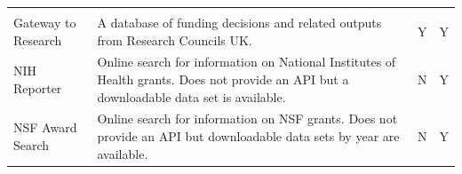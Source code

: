 \documentclass[]{krantz}
\begin{document}
\begin{longtable}[]{@{}llcc@{}}
\begin{minipage}[t]{0.02\columnwidth}
\strut
\end{minipage} & \begin{minipage}[t]{0.02\columnwidth}\centering\strut
\strut
\end{minipage}\tabularnewline
\begin{minipage}[t]{0.10\columnwidth}\raggedright\strut
Gateway to Research\strut
\end{minipage} & \begin{minipage}[t]{0.74\columnwidth}\raggedright\strut
A database of funding decisions and related outputs from Research
Councils UK.\strut
\end{minipage} & \begin{minipage}[t]{0.02\columnwidth}\centering\strut
Y\strut
\end{minipage} & \begin{minipage}[t]{0.02\columnwidth}\centering\strut
Y\strut
\end{minipage}\tabularnewline
\begin{minipage}[t]{0.10\columnwidth}\raggedright\strut
NIH Reporter\strut
\end{minipage} & \begin{minipage}[t]{0.74\columnwidth}\raggedright\strut
Online search for information on National Institutes of Health grants.
Does not provide an API but a downloadable data set is available.\strut
\end{minipage} & \begin{minipage}[t]{0.02\columnwidth}\centering\strut
N\strut
\end{minipage} & \begin{minipage}[t]{0.02\columnwidth}\centering\strut
Y\strut
\end{minipage}\tabularnewline
\begin{minipage}[t]{0.10\columnwidth}\raggedright\strut
NSF Award Search\strut
\end{minipage} & \begin{minipage}[t]{0.74\columnwidth}\raggedright\strut
Online search for information on NSF grants. Does not provide an API but
downloadable data sets by year are available.\strut
\end{minipage} & \begin{minipage}[t]{0.02\columnwidth}\centering\strut
N\strut
\end{minipage} & \begin{minipage}[t]{0.02\columnwidth}\centering\strut
Y\strut
\end{minipage}\tabularnewline
\bottomrule
\end{longtable}
\end{document}
